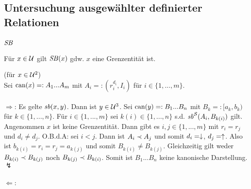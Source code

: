 \subsection{Untersuchung ausgewählter definierter Relationen}

\subsubsection{$\mathit{S\hspace*{-0.25ex}B}$}

\begin{satz}
    Für $x \in \mathcal{U}$ gilt $\mathit{S\hspace*{-0.25ex}B}(x)$ gdw. $x$ eine Grenzentität ist.
\end{satz}

\begin{bew} (für $x \in \mathcal{U}^2$)\\
    Sei $\text{can}(x) =: A_1 ... A_m$ mit $A_i =: (r_i^{d_i}, I_i)$ für $i \in \{1, ..., m\}$.\\ \ \\
    $\boldsymbol{\Rightarrow}$: 
    Es gelte $\mathit{sb}(x,y)$.
    Dann ist $y \in \mathcal{U}^3$.
    Sei $\text{can}(y) =: B_1 ... B_n$ mit $B_k =: [a_k,b_k)$ für $k \in \{1, ..., n\}$.
    Für $i \in \{1, ..., m\}$ sei $k(i) \in \{1, ..., n\}$ s.d. $\mathit{sb}^{\mathcal{S}}(A_i,B_{k(i)})$ gilt.
    Angenommen $x$ ist keine Grenzentität.
    Dann gibt es $i,j \in \{1, ..., m\}$ mit $r_i = r_j$ und $d_i \neq d_j$. O.B.d.A: sei $i<j$. Dann ist $A_i \prec A_j$ und somit $d_i = \downarrow$, $d_j = \uparrow$.
    Also ist $b_{k(i)} = r_i = r_j = a_{k(j)}$ und somit $B_{k(i)} \neq B_{k(j)}$. Gleichzeitig gilt weder $B_{k(i)} \prec B_{k(j)}$ noch $B_{k(j)} \prec B_{k(i)}$. 
    Somit ist $B_1 ... B_n$ keine kanonische Darstellung. $\lightning$\\ \ \\
    $\boldsymbol{\Leftarrow}$:

\end{bew}
